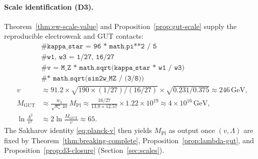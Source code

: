 \documentclass[11pt]{article}
\theoremstyle{plain}
\theoremstyle{definition}
\theoremstyle{remark}
\numberwithin{equation}{section}
\newcommand{\MPl}{M_{\mathrm{Pl}}}
\begin{document}
\paragraph{Scale identification (D3).}
Theorem~\ref{thm:ew-scale-value} and Proposition~\ref{prop:gut-scale} supply
the reproducible electroweak and GUT contacts:
\begin{equation}\label{eq:workbook-planck}
\begin{aligned}
  &\texttt{\# kappa\_star = 96 * math.pi**2 / 5}\\
  &\texttt{\# w1, w3 = 1/27, 16/27}\\
  &\texttt{\# v = M\_Z * math.sqrt(kappa\_star * w1 / w3)}\\
  &\texttt{\#      * math.sqrt(sin2w\_MZ / (3/8))}\\
  v
  &\approx 91.2\times\sqrt{190\times(1/27)/(16/27)}\times\sqrt{0.231/0.375}
  \approx 246\,\mathrm{GeV},\\
  M_{\mathrm{GUT}}
  &\approx \frac{w_3}{\sqrt{\kappa_\star}\,4\pi}\,\MPl
  \approx \frac{16/27}{13.8\times 12.57}\times 1.22\times 10^{19}
  \approx 4\times 10^{16}\,\mathrm{GeV},\\
  \ln\!\frac{\Lambda^2}{v^2}
  &\approx 2\ln\!\frac{M_{\mathrm{GUT}}}{v}
  \approx 65.
\end{aligned}
\end{equation}
The Sakharov identity \eqref{eq:planck-v} then yields $\MPl$ as output once
$(v,\Lambda)$ are fixed by Theorem~\ref{thm:breaking-complete},
Proposition~\ref{prop:lambda-gut}, and Proposition~\ref{prop:d3-closure}
(Section~\ref{sec:scales}).
\end{document}
